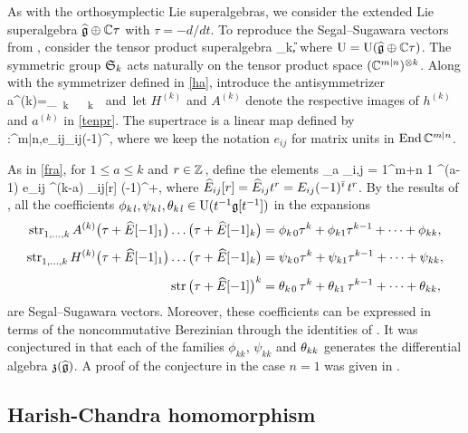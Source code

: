 \documentclass[12pt]{article}
\begin{document}
As with the orthosymplectic Lie superalgebras, we consider
the extended Lie superalgebra  $\widehat{\mathfrak{g}}\oplus \mathbb{C} \tau$ with $\tau=-d/dt$.
To reproduce the Segal--Sugawara vectors from \cite{mr:mm},
consider the tensor product superalgebra
_k{}\otimes \U,
\eeq
where ${\rm U}={\rm U}(\widehat{\mathfrak{g}}\oplus\mathbb{C}\tau)$.
The symmetric group $\mathfrak S_k$
acts naturally on the tensor product
space $(\mathbb{C}^{m|n})^{\otimes k}$. Along with the symmetrizer defined in \eqref{ha},
introduce the antisymmetrizer
a^{(k)}=\sum_{\si\in\Sym_k}\sgn\si\cdot\si\in\CC\Sym_k
\eeq
and let $H^{(k)}$ and $A^{(k)}$ denote
the respective images of $h^{(k)}$ and $a^{(k)}$
in \eqref{tenpr}. The supertrace is a linear map defined by
\ben
\str:\End \CC^{m|n}\to\CC,\qquad e_{ij}\mapsto \de_{ij}(-1)^{\bi},
\een
where we keep the notation $e_{ij}$ for matrix units in ${\rm{End}\,} \mathbb{C}^{m|n}$.

As in \eqref{fra},
for $1 \leqslant a \leqslant k$ and $r \in \mathbb{Z}\hspace{1pt}$, define the elements
\hE[r]_a \coloneqq \sum_{i,j = 1}^{m+n} 1 ^{\otimes (a-1)} \otimes e_{ij} ^{\otimes (k-a)} \otimes \hE_{ij}[r] (-1)^{\bi \bj+\bj},
\eeq
where ${\widehat E}_{ij}[r]={\widehat E}_{ij}t^r=E_{ij}(-1)^{\bar{\imath}}\, t^r$.
By the results of \cite[Sec.~3.1]{mr:mm},
all the coefficients
$\phi_{k\hspace{1pt} l}, \psi_{k\hspace{1pt} l},\theta_{k\hspace{1pt} l}\in{\rm U}(t^{-1}\mathfrak{g}[t^{-1}])$
in the expansions
\begin{align}
{\rm str}^{}_{1,\dots,k}\, A^{(k)} \big(\tau+{\widehat E}[-1]_1\big)\dots \big(\tau+{\widehat E}[-1]_k\big)&={}
\phi_{k\hspace{1pt} 0}\tau^k+\phi_{k1}\tau^{k-1}+\dots+\phi_{kk},
\label{phi}\\[0.4em]
{\rm str}^{}_{1,\dots,k}\, H^{(k)} \big(\tau+{\widehat E}[-1]_1\big)\dots \big(\tau+{\widehat E}[-1]_k\big)&={}
\psi_{k\hspace{1pt} 0}\tau^k+\psi_{k1}\tau^{k-1}+\dots+\psi_{kk},
\label{psi}\\[0.4em]
{\rm str}\, \big(\tau+{\widehat E}[-1]\big)^k&={}
\theta_{k\hspace{1pt} 0}\,\tau^{k}+\theta_{k1}\,\tau^{k-1}
+\dots+\theta_{kk},
\label{theta}
\end{align}
are Segal--Sugawara vectors. Moreover, these coefficients can be expressed in terms of the
noncommutative Berezinian through the identities of \cite[Sec.~2.3]{mr:mm}.
It was conjectured in \cite[Remark~3.4(ii)]{mr:mm} that
each of the families $\phi_{kk}$, $\psi_{kk}$ and $\theta_{kk}$
generates the differential algebra $\mathfrak{z}(\widehat{\mathfrak{g}})$. A proof of the conjecture in the case $n=1$
was given in \cite{afn:ca}.


\subsection{Harish-Chandra homomorphism}
\label{subsec:hchgln}
\end{document}
